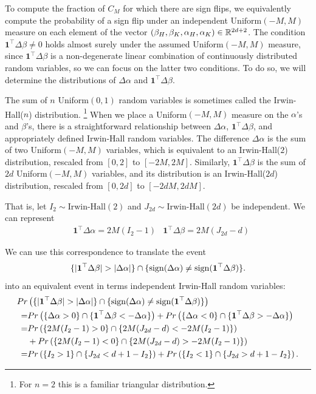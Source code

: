 To compute the fraction of $C_M$ for which there are sign flips, we equivalently compute the probability of a sign flip under an independent $\mathrm{Uniform}(-M,M)$ measure on each element of the vector $(\beta_H, \beta_K, \alpha_H, \alpha_K) \in \mathbb{R}^{2d+2}$.
The condition \( \mathbf{1}^\top \Delta \beta \neq 0 \) holds almost surely under the assumed Uniform$(-M,M)$ measure, since \( \mathbf{1}^\top \Delta \beta \) is a non-degenerate linear combination of continuously distributed random variables, so we can focus on the latter two conditions.
To do so, we will determine the distributions of  \( \Delta \alpha \) and \( \mathbf{1}^\top \Delta \beta \).

The sum of \( n \) Uniform$(0,1)$ random variables is sometimes called the Irwin-Hall(\(n\)) distribution.%
\footnote{For \(n = 2\) this is a familiar triangular distribution.}
When we place a Uniform$(-M, M)$ measure on the \( \alpha \)'s and \( \beta \)'s, there is a straightforward relationship between \( \Delta \alpha \), \( \mathbf{1}^\top \Delta \beta \), and appropriately defined Irwin-Hall random variables.
The difference \( \Delta \alpha \) is the sum of two Uniform$(-M, M)$ variables, which is equivalent to an Irwin-Hall($2$) distribution, rescaled from $[0,2]$ to $[-2M, 2M]$.
Similarly, \( \mathbf{1}^\top \Delta \beta \) is the sum of \( 2 d \) Uniform$(-M, M)$ variables, and its distribution is an Irwin-Hall($2 d$) distribution, rescaled from $[0,2d]$ to \( [-2dM, 2dM] \).

That is, let \( I_2 \sim \text{Irwin-Hall}(2) \) and \( J_{2d} \sim \text{Irwin-Hall}(2d) \) be independent.
We can represent
\begin{align*}
    &\mathbf{1}^\top\Delta \alpha = 2M (I_2 - 1) 
    &\mathbf{1}^\top\Delta \beta  = 2M (J_{2d} - d)
\end{align*}

We can use this correspondence to translate the event 
\[
\{ |\mathbf{1}^\top \Delta \beta| > |\Delta \alpha| \}
\cap
\{ \operatorname{sign}(\Delta \alpha) \neq \operatorname{sign}(\mathbf{1}^\top \Delta \beta) \}.
\]
into an equivalent event in terms independent Irwin-Hall random variables:
\begin{align*}
    Pr& \left( \{ |\mathbf{1}^\top \Delta \beta| > |\Delta \alpha| \}
    \cap
    \{ \operatorname{sign}(\Delta \alpha) \neq \operatorname{sign}(\mathbf{1}^\top \Delta \beta) \} \right) \\
    =& 
    Pr \left( \{ \Delta \alpha > 0 \} \cap \{ \mathbf{1}^\top \Delta \beta < - \Delta \alpha \} \right)
    +
    Pr \left(
    \{ \Delta \alpha < 0 \} \cap \{ \mathbf{1}^\top\Delta \beta > - \Delta \alpha \} \right) \\
    =& 
    Pr \left( \{ 2M (I_2 - 1)  > 0 \} \cap \{ 2M (J_{2d} - d) < - 2M (I_2 - 1)  \} \right)  \\
    &+
    Pr \left( \{ 2M (I_2 - 1)  < 0 \} \cap \{ 2M (J_{2d} - d) > - 2M (I_2 - 1)  \} \right) \\
    =& 
    Pr \left( \{ I_2 > 1 \} \cap \{ J_{2d} < d + 1 - I_2 \}  \right) +
    Pr \left( \{ I_2 < 1 \} \cap \{ J_{2d} > d + 1 - I_2 \} \right).
\end{align*}

